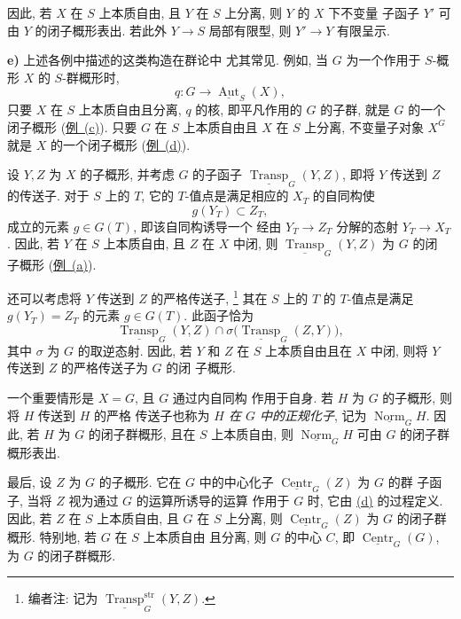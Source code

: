 因此, 若 \(X\) 在 \(S\) 上本质自由, 且 \(Y\)
在 \(S\) 上分离, 则 \(Y\) 的 \(X\) 下不变量
子函子 \(Y'\) 可由 \(Y\) 的闭子概形表出.%
\footnotemark[56]
若此外 \(Y\to S\) 局部有限型, 则
\(Y'\to Y\) 有限呈示.

\medskip
{}\label{ex:sga3-VIB-6.2.4-e}%
\noindent\textbf{e)}
上述各例中描述的这类构造在群论中
尤其常见. 例如, 当 \(G\) 为一个作用于 \(S\)-概形 \(X\)
的 \(S\)-群概形时,
\[
  q:G\longrightarrow\underline{\operatorname{Aut}}_S(X),
\]
只要 \(X\) 在 \(S\) 上本质自由且分离,
\(q\) 的核, 即平凡作用的 \(G\) 的子群, 就是
\(G\) 的一个闭子概形
(\hyperref[ex:sga3-VIB-6.2.4-c]{例~(c)}). 只要
\(G\) 在 \(S\) 上本质自由且 \(X\) 在 \(S\) 上分离,
不变量子对象 \(X^G\) 就是 \(X\) 的一个闭子概形
(\hyperref[ex:sga3-VIB-6.2.4-d]{例~(d)}).

设 \(Y,Z\) 为 \(X\) 的子概形, 并考虑 \(G\) 的子函子
\(\underline{\operatorname{Transp}}_G(Y,Z)\), 即将 \(Y\)
传送到 \(Z\) 的传送子. 对于 \(S\) 上的 \(T\),
它的 \(T\)-值点是满足相应的 \(X_T\) 的自同构使
\[
  g(Y_T)\subset Z_T,
\]
成立的元素 \(g\in G(T)\), 即该自同构诱导一个
经由 \(Y_T\to Z_T\) 分解的态射 \(Y_T\to X_T\).
因此, 若 \(Y\) 在 \(S\) 上本质自由,
且 \(Z\) 在 \(X\) 中闭, 则
\(\underline{\operatorname{Transp}}_G(Y,Z)\) 为 \(G\) 的闭
子概形
(\hyperref[ex:sga3-VIB-6.2.4-a]{例~(a)}).

还可以考虑将 \(Y\) 传送到
\(Z\) 的严格传送子,%
\footnote{\label{note:sga3-VIB-57}编者注: 记为
\(\underline{\operatorname{Transp}}^{\mathrm{str}}_G(Y,Z)\).}
其在 \(S\) 上的 \(T\) 的 \(T\)-值点是满足
\(g(Y_T)=Z_T\) 的元素 \(g\in G(T)\). 此函子恰为
\[
  \underline{\operatorname{Transp}}_G(Y,Z)
  \cap
  \sigma\bigl(\underline{\operatorname{Transp}}_G(Z,Y)\bigr),
\]
其中 \(\sigma\) 为 \(G\) 的取逆态射. 因此,
若 \(Y\) 和 \(Z\) 在 \(S\) 上本质自由且在 \(X\)
中闭, 则将 \(Y\) 传送到 \(Z\) 的严格传送子为 \(G\) 的闭
子概形.

一个重要情形是 \(X=G\), 且 \(G\) 通过内自同构
作用于自身. 若 \(H\) 为 \(G\) 的子概形, 则将 \(H\) 传送到 \(H\) 的严格
传送子也称为 \emph{\(H\) 在 \(G\) 中的正规化子}, 记为
\(\underline{\operatorname{Norm}}_G H\). 因此, 若 \(H\) 为
\(G\) 的闭子群概形, 且在 \(S\) 上本质自由,
则 \(\underline{\operatorname{Norm}}_G H\) 可由
\(G\) 的闭子群概形表出.

最后, 设 \(Z\) 为 \(G\) 的子概形. 它在 \(G\) 中的中心化子
\(\underline{\operatorname{Centr}}_G(Z)\) 为 \(G\) 的群
子函子, 当将 \(Z\) 视为通过 \(G\) 的运算所诱导的运算
作用于 \(G\) 时, 它由
\hyperref[ex:sga3-VIB-6.2.4-d]{(d)} 的过程定义.
因此, 若 \(Z\) 在 \(S\) 上本质自由, 且 \(G\) 在
\(S\) 上分离, 则
\(\underline{\operatorname{Centr}}_G(Z)\) 为 \(G\) 的闭子群
概形. 特别地, 若 \(G\) 在 \(S\) 上本质自由
且分离, 则 \(G\) 的中心 \(C\), 即
\(\underline{\operatorname{Centr}}_G(G)\), 为
\(G\) 的闭子群概形.

